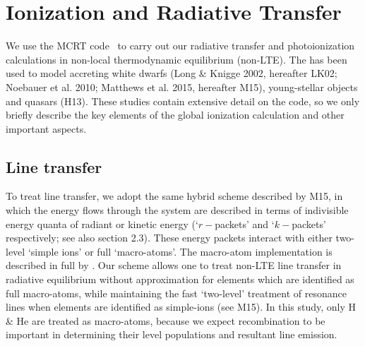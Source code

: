 \documentclass[preprint, a4paper, 11pt]{aastex}
\begin{document}










\section{Ionization and Radiative Transfer}

We use the MCRT code \py\ to carry out our radiative transfer and photoionization
calculations in non-local thermodynamic equilibrium (non-LTE). 
The has been used to model accreting white dwarfs 
(Long \& Knigge 2002, hereafter LK02; Noebauer et al. 2010; 
Matthews et al. 2015, hereafter M15), young-stellar objects \citep{simmacro2005}
and quasars (H13). \nocite{noebauer, M15, LK02}
These studies contain extensive detail on the code, 
so we only briefly describe the key elements of the global 
ionization calculation and other important aspects.

\subsection{Line transfer}

To treat line transfer, we adopt the same hybrid scheme 
described by M15, 
in which the energy flows
through the system are described in terms of indivisible
energy quanta of radiant or kinetic energy 
(`$r-$packets' and `$k-$packets' respectively; see also section 2.3).
These energy packets interact with either two-level `simple ions'
or full `macro-atoms'. The macro-atom implementation 
is described in full by \cite{lucy2002, lucy2003}.
Our scheme allows one to treat non-LTE line transfer in radiative equilibrium
without approximation for elements which are identified as 
full macro-atoms, while maintaining the fast `two-level' 
treatment of resonance lines when elements are identified 
as simple-ions (see M15). In this study,
only H \& He are treated as macro-atoms, because 
we expect recombination to be important
in determining their level populations and resultant line emission.
\end{document}
